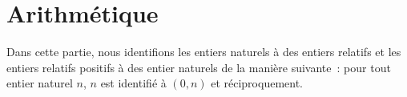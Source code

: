 \section{Arithmétique}
\label{sec:arithmetique}

\localtoc

\noindent Dans cette partie, nous identifions les entiers naturels à des entiers relatifs et les entiers relatifs positifs à des entier naturels de la manière suivante : pour tout entier naturel $n$, $n$ est identifié à $(0,n)$ et réciproquement.











